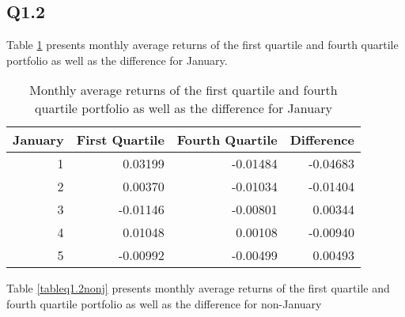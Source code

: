 \documentclass[11pt]{article}
\begin{document}
\subsection{Q1.2}
Table \ref{tableq1.2j} presents monthly average returns of the first quartile and fourth quartile portfolio as well as the difference for January.
\begin{table}[ht]
\centering
\begin{tabular}{rrrr}
  \hline
 January& First Quartile &Fourth Quartile & Difference \\ 
  \hline
1 & 0.03199 & -0.01484 & -0.04683 \\ 
  2 & 0.00370 & -0.01034 & -0.01404 \\ 
  3 & -0.01146 & -0.00801 & 0.00344 \\ 
  4 & 0.01048 & 0.00108 & -0.00940 \\ 
  5 & -0.00992 & -0.00499 & 0.00493 \\ 
   \hline
\end{tabular}
\caption{Monthly average returns of the first quartile and fourth quartile portfolio as well as the difference for January}\label{tableq1.2j}
\end{table}
Table \ref{tableq1.2nonj} presents monthly average returns of the first quartile and fourth quartile portfolio as well as the difference for non-January
\end{document}
